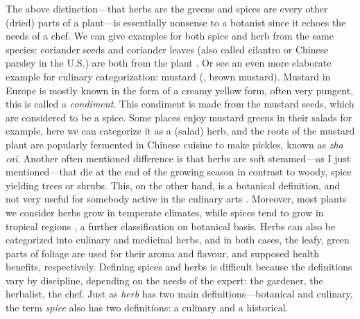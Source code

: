 The above distinction---that herbs are the greens and spices are every other (dried) parts of a plant---is essentially nonsense to a botanist since it echoes the needs of a chef. We can give examples for both spice and herb from the same species: coriander seeds and coriander leaves (also called cilantro or Chinese parsley in the U.S.) are both from the plant .
Or see an even more elaborate example for culinary categorization: mustard (, brown mustard). Mustard in Europe is mostly known in the form of a creamy yellow form, often very pungent, this is called a \textit{condiment}. This condiment is made from the mustard seeds, which are considered to be a spice. Some places enjoy mustard greens in their salads for example, here we can categorize it as a (salad) herb, and the roots of the mustard plant are popularly fermented in Chinese cuisine to make pickles, known as  \textit{zha cai}. Another often mentioned difference is that herbs are soft stemmed---as I just mentioned---that die at the end of the growing season in contrast to woody, spice yielding trees or shrubs. This, on the other hand, is a botanical definition, and not very useful for somebody active in the culinary arts \autocite[10]{allen_herbs_2012}. Moreover, most plants we consider herbs grow in temperate climates, while spices tend to grow in tropical regions \autocite{turner_spice_2004}, a further classification on botanical basis. Herbs can also be categorized into culinary and medicinal herbs, and in both cases, the leafy, green parts of foliage are used for their aroma and flavour, and supposed health benefits, respectively.
Defining spices and herbs is difficult because the definitions vary by discipline, depending on the needs of the expert: the gardener, the herbalist, the chef. Just as \textit{herb} has two main definitions---botanical and culinary, the term \textit{spice} also has two definitions: a culinary and a historical.

